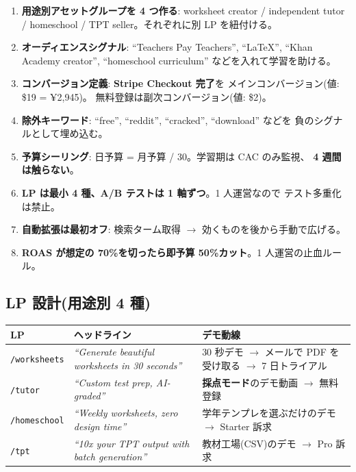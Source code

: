 \documentclass{article}
\newcommand{\hl}[1]{\textcolor{cAlert}{\textbf{#1}}}
\begin{document}
\begin{enumerate}[leftmargin=1.4em,itemsep=3pt]
  \item \hl{用途別アセットグループを 4 つ作る}: worksheet creator / independent tutor /
        homeschool / TPT seller。それぞれに別 LP を紐付ける。
  \item \textbf{オーディエンスシグナル}: ``Teachers Pay Teachers'',
        ``LaTeX'', ``Khan Academy creator'', ``homeschool curriculum''
        などを入れて学習を助ける。
  \item \textbf{コンバージョン定義}: \hl{Stripe Checkout 完了}を
        メインコンバージョン(値: \$19 = ¥2,945)。
        無料登録は副次コンバージョン(値: \$2)。
  \item \textbf{除外キーワード}: ``free'', ``reddit'', ``cracked'', ``download'' などを
        負のシグナルとして埋め込む。
  \item \textbf{予算シーリング}: 日予算 = 月予算 / 30。学習期は CAC のみ監視、
        \textbf{4 週間は触らない}。
  \item \textbf{LP は最小 4 種、A/B テストは 1 軸ずつ}。1 人運営なので
        テスト多重化は禁止。
  \item \textbf{自動拡張は最初オフ}: 検索ターム取得 $\to$ 効くものを後から手動で広げる。
  \item \textbf{ROAS が想定の 70\%を切ったら即予算 50\%カット}。1 人運営の止血ルール。
\end{enumerate}

\subsection*{LP 設計(用途別 4 種)}

\begin{table}[h]
\centering
\small
\begin{tabular}{p{3cm}p{4.5cm}p{5.5cm}}
\toprule
\textbf{LP} & \textbf{ヘッドライン} & \textbf{デモ動線} \\
\midrule
\texttt{/worksheets} & \emph{``Generate beautiful worksheets in 30 seconds''} &
30 秒デモ $\to$ メールで PDF を受け取る $\to$ 7 日トライアル \\
\texttt{/tutor}      & \emph{``Custom test prep, AI-graded''} &
\hl{採点モード}のデモ動画 $\to$ 無料登録 \\
\texttt{/homeschool} & \emph{``Weekly worksheets, zero design time''} &
学年テンプレを選ぶだけのデモ $\to$ Starter 訴求 \\
\texttt{/tpt}        & \emph{``10x your TPT output with batch generation''} &
教材工場(CSV)のデモ $\to$ Pro 訴求 \\
\bottomrule
\end{tabular}
\end{table}
\end{document}
